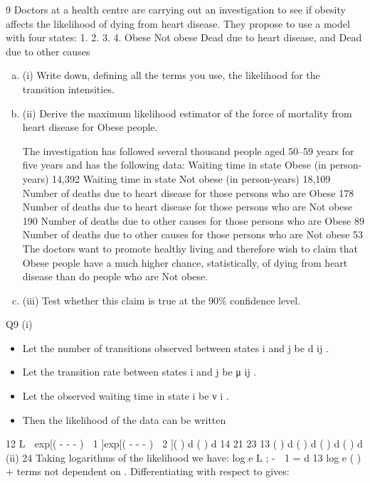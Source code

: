 \documentclass[a4paper,12pt]{article}
\begin{document}
9
Doctors at a health centre are carrying out an investigation to see if obesity affects the
likelihood of dying from heart disease. They propose to use a model with four states:
1.
2.
3.
4.
Obese
Not obese
Dead due to heart disease, and
Dead due to other causes
\begin{enumerate}[(a)]
\item (i) Write down, defining all the terms you use, the likelihood for the transition
intensities.

\item  (ii) Derive the maximum likelihood estimator of the force of mortality from heart
disease for Obese people.

The investigation has followed several thousand people aged 50–59 years for five
years and has the following data:
Waiting time in state Obese (in person-years)
14,392
Waiting time in state Not obese (in person-years)
18,109
Number of deaths due to heart disease for those persons who are Obese
178
Number of deaths due to heart disease for those persons who are Not obese
190
Number of deaths due to other causes for those persons who are Obese
89
Number of deaths due to other causes for those persons who are Not obese
53
The doctors want to promote healthy living and therefore wish to claim that Obese
people have a much higher chance, statistically, of dying from heart disease than do
people who are Not obese.
\item  (iii)
Test whether this claim is true at the 90\% confidence level.
\end{enumerate}
\newpage
Q9
(i)
\begin{itemize}
\item Let the number of transitions observed between states i and j be d ij .
\item Let the transition rate between states i and j be μ ij .
\item Let the observed waiting time in state i be ν i .
\item Then the likelihood of the data can be written
\end{itemize}
12
L  exp[( - -  -  )  1 ]exp[( - -  -  )  2 ](  ) d (  ) d
14
21
23
13
(  ) d (  ) d (  ) d (  ) d
(ii)
24
Taking logarithms of the likelihood we have:
log e L ;\+\; -  1 \;=\; d 13 log e (  ) + terms not dependent on  .
Differentiating with respect to  gives:
\end{document}
